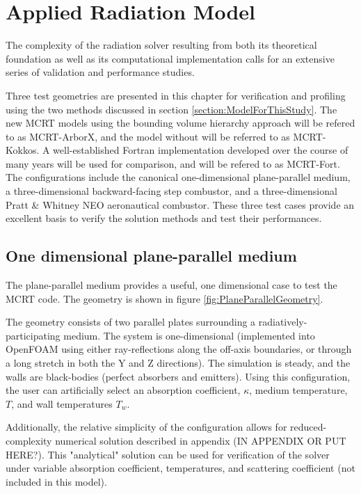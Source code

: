 \addchapheadtotoc
\chapter{Applied Radiation Model}\label{chapter:Example}
The complexity of the radiation solver resulting from both its theoretical foundation as well as its computational implementation calls for an extensive series of validation and performance studies.

Three test geometries are presented in this chapter for verification and profiling using the two methods discussed in section \ref{section:ModelForThisStudy}. The new MCRT models using the bounding volume hierarchy approach will be refered to as MCRT-ArborX, and the model without will be referred to as MCRT-Kokkos. 
A well-established Fortran implementation developed over the course of many years will be used for comparison, and will be refered to as MCRT-Fort.
The configurations include the canonical one-dimensional plane-parallel medium, a three-dimensional backward-facing step combustor, and a three-dimensional Pratt \& Whitney NEO aeronautical combustor. 
These three test cases provide an excellent basis to verify the solution methods and test their performances. 



\section{One dimensional plane-parallel medium}
The plane-parallel medium provides a useful, one dimensional case to test the MCRT code. The geometry is shown in figure \ref{fig:PlaneParallelGeometry}.

The geometry consists of two parallel plates surrounding a radiatively-participating medium. The system is one-dimensional (implemented into OpenFOAM using either ray-reflections along the off-axis boundaries, or through a long stretch in both the Y and Z directions). The simulation is steady, and the walls are black-bodies (perfect absorbers and emitters).
Using this configuration, the user can artificially select an absorption coefficient, $\kappa{}$, medium temperature, $T$, and wall temperatures $T_w$.

Additionally, the relative simplicity of the configuration allows for reduced-complexity numerical solution described in appendix (IN APPENDIX OR PUT HERE?). 
This "analytical" solution can be used for verification of the solver under variable absorption coefficient, temperatures, and scattering coefficient (not included in this model).

